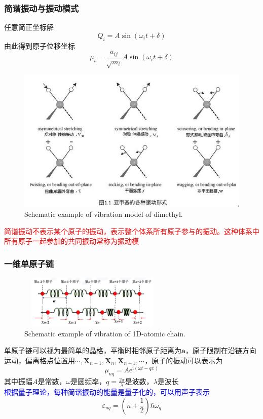 \documentclass[cjk,slidestop,compress,mathserif,blue]{beamer}
\begin{document}
\frame
{
	\frametitle{简谐振动与振动模式}
	任意简正坐标解
	\begin{displaymath}
		Q_i=A\sin(\omega_it+\delta)
	\end{displaymath}
	由此得到原子位移坐标
	\begin{displaymath}
		\mu_i=\frac{a_{ij}}{\sqrt{m_i}}A\sin(\omega_it+\delta)
	\end{displaymath}
\begin{figure}[h!]
\centering
\vspace*{-0.1in}
\includegraphics[height=1.in,width=2.in,viewport=0 20 420 250,clip]{Figures/RF_vir.jpg}
\caption{\tiny \textrm{Schematic example of vibration model of dimethyl.}}%
\label{virbration_model}
\end{figure} 
\textcolor{red}{简谐振动不表示某个原子的振动，表示整个体系所有原子参与的振动。这种体系中所有原子一起参加的共同振动常称为振动模}
}

\frame
{
	\frametitle{一维单原子链}
\begin{figure}[h!]
\centering
\vspace*{-0.25in}
\includegraphics[height=1.0in,width=2.8in,viewport=0 0 1400 500,clip]{Figures/virbration.png}
\caption{\tiny \textrm{Schematic example of vibration of 1D-atomic chain.}}%
\label{virbration}
\end{figure} 
单原子链可以视为最简单的晶格，平衡时相邻原子距离为$\mathbf{a}$，原子限制在沿链方向运动，偏离格点位置用$\cdots,\mathbf{X}_{n-1},\mathbf{X}_{n},\mathbf{X}_{n+1},\cdots$，原子的振动可以表示为
\begin{displaymath}
	\mu_{nq}=A\mathrm{e}^{\mathrm{i}(\omega t-qx)}
\end{displaymath}
其中振幅$A$是常数，$\omega$是圆频率，$q=\tfrac{2\pi}{\lambda}$是波数，$\lambda$是波长\\
\textcolor{blue}{根据量子理论，每种简谐振动的能量是量子化的，可以用声子表示}
\begin{displaymath}
	\varepsilon_{nq}=\left( n+\frac12 \right)\hbar\omega_q
\end{displaymath}
}
\end{document}
